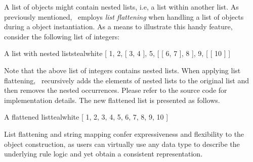 A list of objects might contain nested lists, i.e, a list within another list. As previously mentioned, \arara\ employs \emph{list flattening} when handling a list of objects during a  object instantiation. As a means to illustrate this handy feature, consider the following list of integers:

\begin{codebox}{A list with nested lists}{teal}{\icnote}{white}
[ 1, 2, [ 3, 4 ], 5, [ [ 6, 7 ], 8 ], 9, [ [ 10 ] ]
\end{codebox}

Note that the above list of integers contains nested lists. When applying list flattening, \arara\ recursively adds the elements of nested lists to the original list and then removes the nested occurrences. Please refer to the source code for implementation details. The new flattened list is presented as follows.

\begin{codebox}{A flattened list}{teal}{\icnote}{white}
[ 1, 2, 3, 4, 5, 6, 7, 8, 9, 10 ]
\end{codebox}

List flattening and string mapping confer expressiveness and flexibility to the  object construction, as users can virtually use any data type to describe the underlying rule logic and yet obtain a consistent representation.

